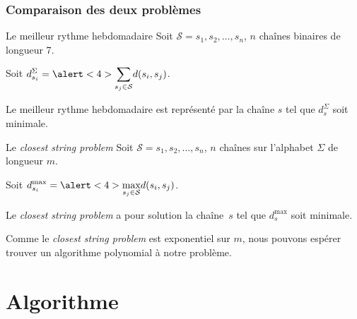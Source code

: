 \documentclass[table]{beamer}
\newcommand{\+}{\cellcolor[gray]{1}\bfseries}
\newcommand{\<}{\cellcolor[gray]{0.8}\rmfamily\itshape}
\def\S{\mathcal{S}}
\newcommand{\nologo}{\setbeamertemplate{logo}{}}
\newcommand*{\foreign}[2][english]{%
    \emph{\foreignlanguage{#1}{#2}}%
}
\begin{document}
{\nologo
\begin{frame}
  \frametitle{Comparaison des deux problèmes}

  \begin{block}{Le meilleur rythme hebdomadaire}
    Soit $\S = s_1, s_2, \ldots, s_n$, $n$ chaînes \alert<2>{binaires}
    de \alert<3>{longueur 7}.


    Soit
    \begin{math}
      \displaystyle
      d^\Sigma_{s_i} = \alert<4>{\sum_{s_j\in\S}} d(s_i, s_j)
    \end{math}.

    Le meilleur rythme hebdomadaire est représenté par la chaîne $s$
    tel que $d^\Sigma_s$ soit minimale.
  \end{block}

  \begin{block}{Le \foreign{closest string problem}}
    Soit $\S = s_1, s_2, \ldots, s_n$, $n$ chaînes \alert<2>{sur
      l'alphabet $\Sigma$} de \alert<3>{longueur $m$}.

    Soit
    \begin{math}
      \displaystyle
      d^{\max}_{s_i} = \alert<4>{\max_{s_j\in\S}} d(s_i, s_j)
    \end{math}.

    Le \emph{closest string problem} a pour solution la chaîne~$s$ tel
    que $d^{\max}_s$ soit minimale.
  \end{block}

  \pause[5] Comme le \foreign{closest string problem} est exponentiel
  sur $m$, nous pouvons espérer trouver un algorithme polynomial à
  notre problème.
\end{frame}
}

\section{Algorithme}
\end{document}
